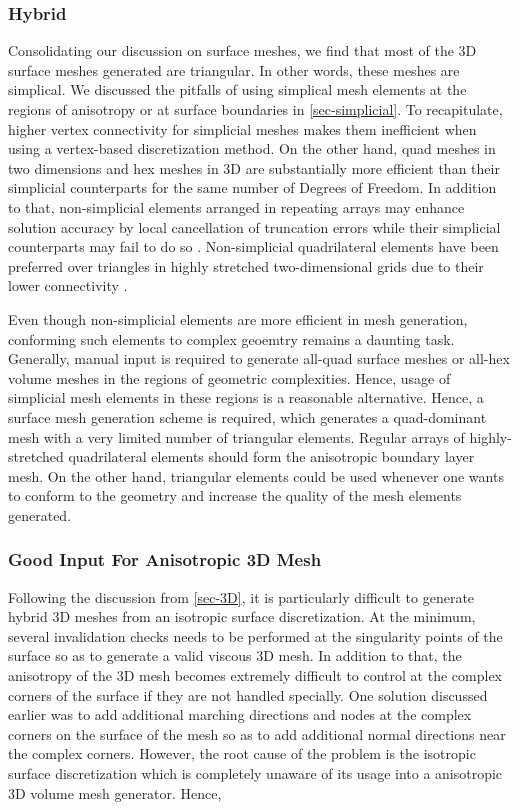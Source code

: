 \subsubsection{Hybrid}
Consolidating our discussion on surface meshes, we find that most of the 3D surface meshes generated are triangular. In other words, these meshes are simplical. We discussed the pitfalls of using simplical mesh elements at the regions of anisotropy or at surface boundaries in \ref{sec-simplicial}. To recapitulate, higher vertex connectivity for simplicial meshes makes them inefficient when using a vertex-based discretization method. On the other hand, quad meshes in two dimensions and hex meshes in 3D are substantially more efficient than their simplicial counterparts for the same number of Degrees of Freedom. In addition to that, non-simplicial elements arranged in repeating arrays may enhance solution accuracy by local cancellation of truncation errors while their simplicial counterparts may fail to do so \cite{mavriplis1997unstructured}. Non-simplicial quadrilateral elements have been preferred over triangles in highly stretched two-dimensional grids due to their lower connectivity \cite{aftosmis1994accuracy}.

Even though non-simplicial elements are more efficient in mesh generation, conforming such elements to complex geoemtry remains a daunting task. Generally, manual input is required to generate all-quad surface meshes or all-hex volume meshes in the regions of geometric complexities. Hence, usage of simplicial mesh elements in these regions is a reasonable alternative. Hence, a surface mesh generation scheme is required, which generates a quad-dominant mesh with a very limited number of triangular elements. Regular arrays of highly-stretched quadrilateral elements should form the anisotropic boundary layer mesh. On the other hand, triangular elements could be used whenever one wants to conform to the geometry and increase the quality of the mesh elements generated.

\subsubsection{Good Input For Anisotropic 3D Mesh}
Following the discussion from \ref{sec-3D}, it is particularly difficult to generate  hybrid 3D meshes from an isotropic surface discretization. At the minimum, several invalidation checks needs to be performed at the singularity points of the surface so as to generate a valid viscous 3D mesh. In addition to that, the anisotropy of the 3D mesh becomes extremely difficult to control at the complex corners of the surface if they are not handled specially. One solution discussed earlier was to add additional marching directions and nodes at the complex corners on the surface of the mesh so as to add additional normal directions near the complex corners. However, the root cause of the problem is the isotropic surface discretization which is completely unaware of its usage into a anisotropic 3D volume mesh generator. Hence, 

